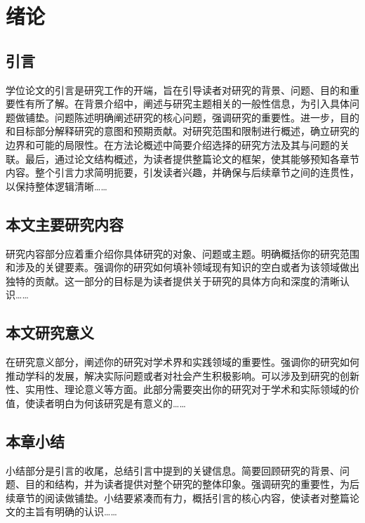 \cleardoublepage
{}

\section{绪论}
\subsection{引言}
学位论文的引言是研究工作的开端，旨在引导读者对研究的背景、问题、目的和重要性有所了解。在背景介绍中，阐述与研究主题相关的一般性信息，为引入具体问题做铺垫。问题陈述明确阐述研究的核心问题，强调研究的重要性。进一步，目的和目标部分解释研究的意图和预期贡献。对研究范围和限制进行概述，确立研究的边界和可能的局限性。在方法论概述中简要介绍选择的研究方法及其与问题的关联。最后，通过论文结构概述，为读者提供整篇论文的框架，使其能够预知各章节内容。整个引言力求简明扼要，引发读者兴趣，并确保与后续章节之间的连贯性，以保持整体逻辑清晰……

\subsection{本文主要研究内容}
研究内容部分应着重介绍你具体研究的对象、问题或主题。明确概括你的研究范围和涉及的关键要素。强调你的研究如何填补领域现有知识的空白或者为该领域做出独特的贡献。这一部分的目标是为读者提供关于研究的具体方向和深度的清晰认识……

\subsection{本文研究意义}
在研究意义部分，阐述你的研究对学术界和实践领域的重要性。强调你的研究如何推动学科的发展，解决实际问题或者对社会产生积极影响。可以涉及到研究的创新性、实用性、理论意义等方面。此部分需要突出你的研究对于学术和实际领域的价值，使读者明白为何该研究是有意义的……

\subsection{本章小结}
小结部分是引言的收尾，总结引言中提到的关键信息。简要回顾研究的背景、问题、目的和结构，并为读者提供对整个研究的整体印象。强调研究的重要性，为后续章节的阅读做铺垫。小结要紧凑而有力，概括引言的核心内容，使读者对整篇论文的主旨有明确的认识……
